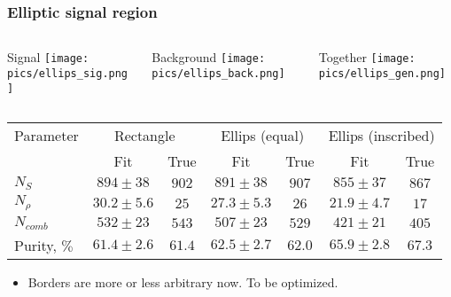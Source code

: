 \documentclass[10 pt,compress,mathserif]{beamer}
\begin{document}
\begin{frame}
 \frametitle{Elliptic signal region}
 \begin{small}
 \begin{columns}
  \begin{column}{0.33\textwidth}
  \begin{center}
   Signal
   \texttt{[image: pics/ellips\_sig.png]}
  \end{center}
  \end{column}
  \begin{column}{0.33\textwidth}
  \begin{center}
   Background
   \texttt{[image: pics/ellips\_back.png]}
  \end{center}
  \end{column}
  \begin{column}{0.33\textwidth}
  \begin{center}
   Together
   \texttt{[image: pics/ellips\_gen.png]}
  \end{center}
  \end{column}
 \end{columns}

 \begin{table}[bt]
 \small
 \begin{tabular}{|l|c|c|c|c|c|c|} \hline
  Parameter & \multicolumn{2}{c|}{Rectangle}& \multicolumn{2}{c|}{Ellips (equal)} & \multicolumn{2}{c|}{Ellips (inscribed)}\\ \hhline{~------}
            &      Fit   & True &      Fit   & True &  Fit       & True  \\ \hline
$N_S$       &$894\pm38$  &$902$ &$891\pm38$  &$907$ &$855\pm37$  & $867$ \\ \hline
$N_{\rho}$  &$30.2\pm5.6$&$25$  &$27.3\pm5.3$&$26$  &$21.9\pm4.7$& $17$  \\ \hline
$N_{comb}$  &$532 \pm 23$&$543$ &$507\pm23$  &$529$ &$421\pm21$  & $405$ \\ \hline
Purity, $\%$&$61.4\pm2.6$&$61.4$&$62.5\pm2.7$&$62.0$&$65.9\pm2.8$& $67.3$\\ \hline
 \end{tabular}
 \end{table}

 \begin{itemize}
  \item Borders are more or less arbitrary now. To be optimized.
 \end{itemize}
\end{small}
\end{frame}
\end{document}
